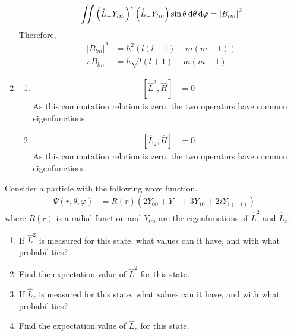 \documentclass[fleqn, a4paper, 11pt, oneside]{amsart}
\theoremstyle{definition}
\theoremstyle{theorem}
\begin{document}
\begin{solution}
\begin{enumerate}[leftmargin=*]
			\begin{align*}
				\iint \left( \hat{L}_- Y_{l m} \right)^* \left( \hat{L}_- Y_{l m} \right) \sin \theta \dif \theta \dif \varphi & = \left| B_{l m} \right|^2 \\
			\end{align*}
			Therefore,
			\begin{align*}
				\left| B_{l m} \right|^2 & = \hbar^2 \left( l (l + 1) - m (m - 1) \right) \\
				\therefore B_{l m}       & = h \sqrt{l (l + 1) - m (m - 1)}
			\end{align*}
		\item
			\begin{enumerate}[leftmargin=*]
				\item
					\begin{align*}
						\left[ \hat{L}^2,\hat{H} \right] & = 0
					\end{align*}
					As this commutation relation is zero, the two operators have common eigenfunctions.
				\item
					\begin{align*}
						\left[ \hat{L}_z,\hat{H} \right] & = 0
					\end{align*}
					As this commutation relation is zero, the two operators have common eigenfunctions.
			\end{enumerate}
	\end{enumerate}
\end{solution}

\begin{question}
	Consider a particle with the following wave function.
	\begin{align*}
		\Psi(r,\theta,\varphi) & = R(r) (2 Y_{0 0} + Y_{1 1} + 3 Y_{1 0} + 2 i Y_{1 (-1)})
	\end{align*}
	where $R(r)$ is a radial function and $Y_{l m}$ are the eigenfunctions of $\hat{L}^2$ and $\hat{L}_z$.
	\begin{enumerate}
		\item
			If $\hat{L}^2$ is measured for this state, what values can it have, and with what probabilities?
		\item
			Find the expectation value of $\hat{L}^2$ for this state.
		\item
			If $\hat{L}_z$ is measured for this state, what values can it have, and with what probabilities?
		\item
			Find the expectation value of $\hat{L}_z$ for this state.
	\end{enumerate}
\end{question}
\end{document}
